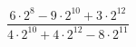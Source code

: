 \begin{ex}[type=calculate]
	\begin{condition}
		\( \dfrac{6\cdot2^8-9\cdot2^{10}+3\cdot2^{12}}{4\cdot2^{10}+4\cdot2^{12}-8\cdot2^{11}} \)
	\end{condition}
\end{ex}